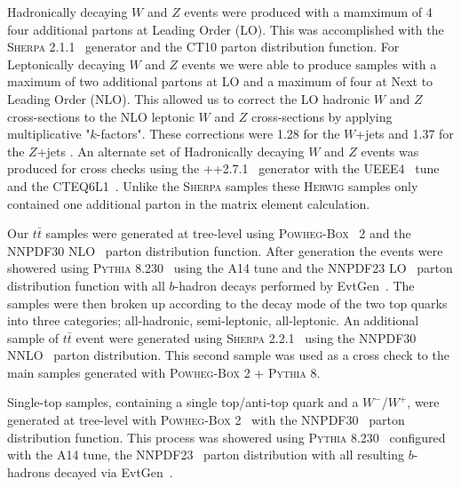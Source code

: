 Hadronically decaying $W$ and $Z$ events were produced with a mamximum of 4
four additional partons at Leading Order (LO).  This was accomplished with the
\textsc{Sherpa} 2.1.1~\cite{Gleisberg:2008ta} generator and the CT10
\cite{Lai:2010vv} parton distribution function.  For Leptonically decaying $W$
and $Z$ events we were able to produce samples with a maximum of two additional
partons at LO and a maximum of four at Next to Leading Order (NLO).  This
allowed us to correct the LO hadronic $W$ and $Z$ cross-sections to the NLO
leptonic $W$ and $Z$ cross-sections by applying multiplicative "$k$-factors".
These corrections were 1.28 for the $W$+jets and 1.37 for the $Z$+jets
\cite{Aaboud:2018zba}. An alternate set of Hadronically decaying $W$ and $Z$
events was produced for cross checks using the
++2.7.1~\cite{Bahr:2008pv} generator with the
UEEE4~\cite{Buckley:2018wdv} tune and the CTEQ6L1~\cite{Pumplin:2002vw}. Unlike
the \textsc{Sherpa} samples these \textsc{Herwig} samples only contained one
additional parton in the matrix element calculation.

Our $t\bar{t}$ samples were generated at tree-level using
\textsc{Powheg-Box}~\cite{Campbell2012} 2 and the NNPDF30
NLO~\cite{Ball:2014uwa} parton distribution function. After generation the
events were showered using \textsc{Pythia} 8.230~\cite{Sjostrand:2014zea} using
the A14 tune and the NNPDF23 LO~\cite{Carrazza:2013axa} parton
distribution function with all $b$-hadron decays performed by
EvtGen~\cite{LANGE2001152}.  The samples were then broken up according to the
decay mode of the two top quarks into three categories; all-hadronic,
semi-leptonic, all-leptonic. An additional sample of $t\bar{t}$ event were
generated using \textsc{Sherpa} 2.2.1~\cite{Gleisberg:2008ta} using the NNPDF30
NNLO~\cite{Ball:2014uwa} parton distribution.  This second sample was used as a
cross check to the main samples generated with \textsc{Powheg-Box} 2 +
\textsc{Pythia} 8.

Single-top samples, containing a single top/anti-top quark and a
$W^{-}$/$W^{+}$, were generated at tree-level with \textsc{Powheg-Box}
2~\cite{Campbell2012} with the NNPDF30~\cite{Lai:2010vv} parton distribution
function. This process was showered using \textsc{Pythia}
8.230~\cite{Sjostrand:2014zea} configured with the A14 tune, the
NNPDF23~\cite{Carrazza:2013axa} parton distribution with all resulting
$b$-hadrons decayed via EvtGen~\cite{LANGE2001152}.
